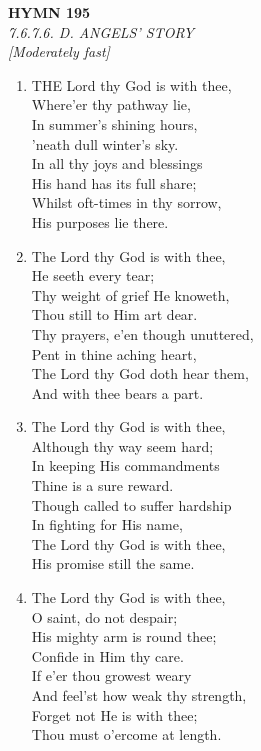 \documentclass[11pt,a4paper]{article}
\begin{document}
\newpage
\begin{center}
    {\Large \textbf{HYMN 195}}
    \\
    \textit{7.6.7.6. D. ANGELS' STORY}
    \\
    \textit{\small [Moderately fast]}
\end{center}
\vspace{1em}

\begin{enumerate}
    \item THE Lord thy God is with thee, \\
        Where'er thy pathway lie, \\
        In summer's shining hours, \\
        'neath dull winter's sky. \\
        In all thy joys and blessings \\
        His hand has its full share; \\
        Whilst oft-times in thy sorrow, \\
        His purposes lie there.

    \item The Lord thy God is with thee, \\
        He seeth every tear; \\
        Thy weight of grief He knoweth, \\
        Thou still to Him art dear. \\
        Thy prayers, e'en though unuttered, \\
        Pent in thine aching heart, \\
        The Lord thy God doth hear them, \\
        And with thee bears a part.

    \item The Lord thy God is with thee, \\
        Although thy way seem hard; \\
        In keeping His commandments \\
        Thine is a sure reward. \\
        Though called to suffer hardship \\
        In fighting for His name, \\
        The Lord thy God is with thee, \\
        His promise still the same.

    \item The Lord thy God is with thee, \\
        O saint, do not despair; \\
        His mighty arm is round thee; \\
        Confide in Him thy care. \\
        If e'er thou growest weary \\
        And feel'st how weak thy strength, \\
        Forget not He is with thee; \\
        Thou must o'ercome at length.


\end{enumerate}
\end{document}
